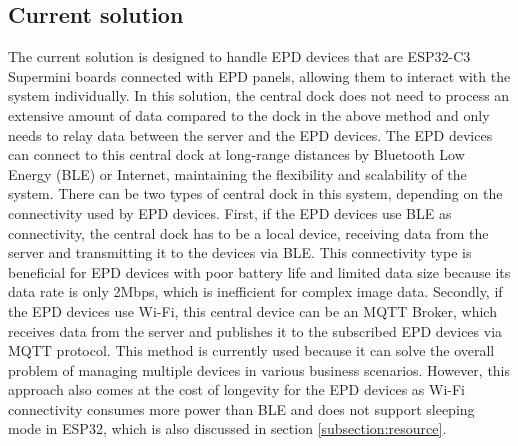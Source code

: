 \documentclass[../Main.tex]{subfiles}
\begin{document}
\subsection{Current solution}
The current solution is designed to handle \gls{EPD} devices that are ESP32-C3 Supermini boards connected with \gls{EPD} panels, allowing them to interact with the system individually. In this solution, the central dock does not need to process an extensive amount of data compared to the dock in the above method and only needs to relay data between the server and the \gls{EPD} devices. The \gls{EPD} devices can connect to this central dock at long-range distances by Bluetooth Low Energy (BLE) or Internet, maintaining the flexibility and scalability of the system. There can be two types of central dock in this system, depending on the connectivity used by \gls{EPD} devices. First, if the \gls{EPD} devices use BLE as connectivity, the central dock has to be a local device, receiving data from the server and transmitting it to the devices via BLE. This connectivity type is beneficial for \gls{EPD} devices with poor battery life and limited data size because its data rate is only 2Mbps, which is inefficient for complex image data. Secondly, if the \gls{EPD} devices use Wi-Fi, this central device can be an MQTT Broker, which receives data from the server and publishes it to the subscribed \gls{EPD} devices via MQTT protocol. This method is currently used because it can solve the overall problem of managing multiple devices in various business scenarios. However, this approach also comes at the cost of longevity for the \gls{EPD} devices as Wi-Fi connectivity consumes more power than BLE and does not support sleeping mode in ESP32, which is also discussed in section \ref{subsection:resource}.
\end{document}
